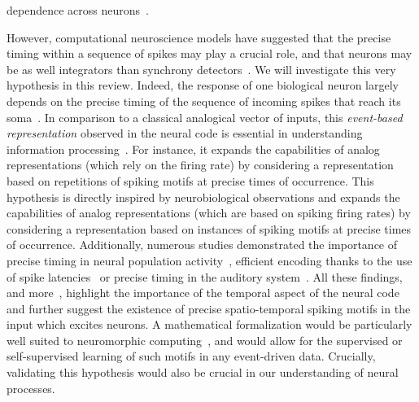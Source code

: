 \documentclass[brainsci, %
               review,submit,pdftex,moreauthors
               ]{Definitions/mdpi}
\begin{document}
dependence across neurons~\citep{perkel_neuronal_1967-1}. 

However, computational neuroscience models have suggested that the precise timing within a sequence of spikes may play a crucial role, and that neurons may be as well integrators than synchrony detectors~\citep{abeles_role_1982}. We will investigate this very hypothesis in this review. Indeed, the response of one biological neuron largely depends on the precise timing of the sequence of incoming spikes that reach its soma~\citep{paugam-moisy_computing_2012}. In comparison to a classical analogical vector of inputs, this \emph{event-based representation} observed in the neural code is essential in understanding information processing~\citep{carr_processing_1993}. For instance, it expands the capabilities of analog representations (which rely on the firing rate) by considering a representation based on repetitions of spiking motifs at precise times of occurrence. This hypothesis is directly inspired by neurobiological observations and expands the capabilities of analog representations (which are based on spiking firing rates) by considering a representation based on instances of spiking motifs at precise times of occurrence. Additionally, numerous studies demonstrated the importance of precise timing in neural population activity~\citep{davis_spontaneous_2021}, efficient encoding thanks to the use of spike latencies~\citep{perrinet_coding_2004,gollisch_rapid_2008} or precise timing in the auditory system~\citep{deweese_binary_2003,carr_circuit_1990}. All these findings, and more~\citep{bohte_evidence_2004}, highlight the importance of the temporal aspect of the neural code and further suggest the existence of precise spatio-temporal spiking motifs in the input which excites neurons.  A mathematical formalization would be particularly well suited to neuromorphic computing~\citep{roy_towards_2019}, and would allow for the supervised or self-supervised learning of such motifs in any event-driven data.  Crucially, validating this hypothesis would also be crucial in our understanding of neural processes. %
%
\end{document}
